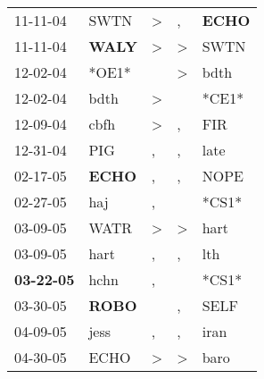 \begin{supertabular}{p{0.07\textwidth}p{0.06\textwidth}p{0.02\textwidth}p{0.02\textwidth}p{0.06\textwidth}}
          11-11-04\textsuperscript{} &           SWTN\textsuperscript{} &     \textgreater &                , &  \textbf{ECHO\textsuperscript{}} \\
          11-11-04\textsuperscript{} &  \textbf{WALY\textsuperscript{}} &     \textgreater &     \textgreater &           SWTN\textsuperscript{} \\
          12-02-04\textsuperscript{} &                            *OE1* &                  &     \textgreater &           bdth\textsuperscript{} \\
          12-02-04\textsuperscript{} &           bdth\textsuperscript{} &     \textgreater &                  &                            *CE1* \\
          12-09-04\textsuperscript{} &           cbfh\textsuperscript{} &     \textgreater &                , &            FIR\textsuperscript{} \\
          12-31-04\textsuperscript{} &            PIG\textsuperscript{} &                , &                , &           late\textsuperscript{} \\
          02-17-05\textsuperscript{} &  \textbf{ECHO\textsuperscript{}} &                , &                , &           NOPE\textsuperscript{} \\
          02-27-05\textsuperscript{} &            haj\textsuperscript{} &                , &                  &                            *CS1* \\
          03-09-05\textsuperscript{} &           WATR\textsuperscript{} &     \textgreater &     \textgreater &           hart\textsuperscript{} \\
          03-09-05\textsuperscript{} &           hart\textsuperscript{} &                , &                , &            lth\textsuperscript{} \\
 \textbf{03-22-05\textsuperscript{}} &           hchn\textsuperscript{} &                , &                  &                            *CS1* \\
          03-30-05\textsuperscript{} &  \textbf{ROBO\textsuperscript{}} &                  &                , &           SELF\textsuperscript{} \\
          04-09-05\textsuperscript{} &           jess\textsuperscript{} &                , &                , &           iran\textsuperscript{} \\
          04-30-05\textsuperscript{} &           ECHO\textsuperscript{} &     \textgreater &     \textgreater &           baro\textsuperscript{} \\

\end{supertabular}

